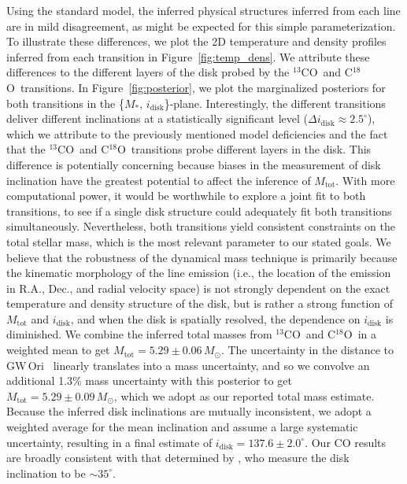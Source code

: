 \documentclass[twocolumn]{aastex61}
\newcommand{\gw}{GW\,Ori}
\newcommand{\thirteen}{${}^{13}$CO}
\newcommand{\eighteen}{C${}^{18}$O}
\begin{document}
Using the standard model, the inferred physical structures inferred from each line are in mild disagreement, as might be expected for this simple parameterization. To illustrate these differences, we plot the 2D temperature and density profiles inferred from each transition in Figure~\ref{fig:temp_dens}. We attribute these differences to the different layers of the disk probed by the \thirteen\ and \eighteen\ transitions. In Figure~\ref{fig:posterior}, we plot the marginalized posteriors for both transitions in the \{$M_\ast$, $i_\mathrm{disk}$\}-plane. Interestingly, the different transitions deliver different inclinations at a statistically significant level ($\Delta i_\mathrm{disk} \approx 2.5^\circ$), which we attribute to the previously mentioned model deficiencies and the fact that the \thirteen\ and \eighteen\ transitions probe different layers in the disk.
This difference is potentially concerning because biases in the measurement of disk inclination have the greatest potential to affect the inference of $M_\mathrm{tot}$. With more computational power, it would be worthwhile to explore a joint fit to both transitions, to see if a single disk structure could adequately fit both transitions simultaneously.
Nevertheless, both transitions yield consistent constraints on the total stellar mass, which is the most relevant parameter to our stated goals. We believe that the robustness of the dynamical mass technique is primarily because the kinematic morphology of the line emission (i.e., the location of the emission in R.A., Dec., and radial velocity space) is not strongly dependent on the exact temperature and density structure of the disk, but is rather a strong function of $M_\mathrm{tot}$ and $i_\mathrm{disk}$, and when the disk is spatially resolved, the dependence on $i_\mathrm{disk}$ is diminished. We combine the inferred total masses from \thirteen\ and \eighteen\ in a weighted mean to get $M_\mathrm{tot} = 5.29 \pm 0.06\,M_\odot$.
The uncertainty in the distance to \gw\ \citep[$388 \pm 5\,$pc;][]{kounkel17} linearly translates into a mass uncertainty, and so we convolve an additional 1.3\% mass uncertainty with this posterior to get  $M_\mathrm{tot} = 5.29 \pm 0.09\,M_\odot$, which we adopt as our reported total mass estimate. Because the inferred disk inclinations are mutually inconsistent, we adopt a weighted average for the mean inclination and assume a large systematic uncertainty, resulting in a final estimate of $i_\mathrm{disk} = 137.6 \pm 2.0^\circ$. Our CO results are broadly consistent with that determined by \citet{fang17}, who measure the disk inclination to be $\sim 35^\circ$.
\end{document}
